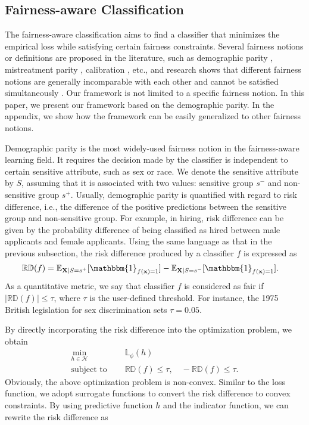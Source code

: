 \documentclass[letterpaper]{article} %
\newcommand{\X}{\mathbf{X}}
\newcommand{\x}{\mathbf{x}}
\newcommand{\E}{\mathbb{E}}
\newcommand{\I}{\mathbbm{1}}
\newcommand{\sign}{\textrm{sign}}
\newcommand{\Loss}{\mathbb{L}}
\newcommand{\RD}{\mathbb{RD}}
\begin{document}
\subsection{Fairness-aware Classification}
The fairness-aware classification aims to find a classifier that minimizes the empirical loss while satisfying certain fairness constraints. Several fairness notions or definitions are proposed in the literature, such as demographic parity \cite{Pedreshi2008}, mistreatment parity \cite{Zafar2017b}, calibration \cite{Pleiss2017a}, etc., and research shows that different fairness notions are generally incomparable with each other and cannot be satisfied simultaneously \cite{Kleinberg2016}. Our framework is not limited to a specific fairness notion. In this paper, we present our framework based on the demographic parity. In the appendix, we show how the framework can be easily generalized to other fairness notions.

Demographic parity is the most widely-used fairness notion in the fairness-aware learning field. It requires the decision made by the classifier is independent to certain sensitive attribute, such as sex or race. We denote the sensitive attribute by $S$, assuming that it is associated with two values: sensitive group $s^{-}$ and non-sensitive group $s^{+}$. Usually, demographic parity is quantified with regard to risk difference, i.e., the difference of the positive predictions between the sensitive group and non-sensitive group. For example, in hiring, risk difference can be given by the probability difference of being classified as hired between male applicants and female applicants. Using the same language as that in the previous subsection, the risk difference produced by a classifier $f$ is expressed as
\begin{align*}
	\RD (f) = \E_{\X|S=s^+} [\I_{f(\x) = 1}] - \E_{\X|S=s^-} [\I_{f(\x) = 1}]. &
\end{align*}
As a quantitative metric, we say that classifier $f$ is considered as fair if $ |\RD (f)| \leq \tau$, where $ \tau $ is the user-defined threshold. For instance,
the 1975 British legislation for sex discrimination sets $\tau = 0.05$.

By directly incorporating the risk difference into the optimization problem, we obtain
\begin{align}
	\min_{ h \in \mathcal{H}} \quad & \Loss_\phi (h)     \label{opt:constained_fair_classification} \\
	\text{subject to }        \quad & \RD (f) \leq \tau, \quad  -\RD (f) \leq \tau. \nonumber
\end{align}
Obviously, the above optimization problem is non-convex. Similar to the loss function, we adopt surrogate functions to convert the risk difference to convex constraints. By using predictive function $h$ and the indicator function, we can rewrite the risk difference as
\end{document}
